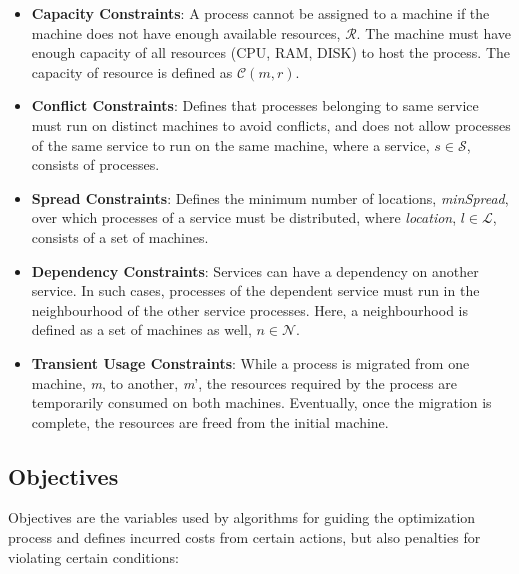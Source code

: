 \documentclass[a4paper,12pt]{Classes/RoboticsLaTeX}
\begin{document}
\begin{itemize}
\item
  \textbf{Capacity Constraints}: A process cannot be assigned to a machine if the machine does not have enough available resources, \(\mathcal{R}\). The machine must have enough capacity of all resources (CPU, RAM, DISK) to host the process. The capacity of resource is defined as \(\mathcal{C} (\textit{m}, \textit{r})\).
\item
  \textbf{Conflict Constraints}: Defines that processes belonging to same service must run on distinct machines to avoid conflicts, and does not allow processes of the same service to run on the same machine, where a service, \(\textit{s} \in \mathcal{S}\), consists of processes.
\item
  \textbf{Spread Constraints}: Defines the minimum number of locations, \emph{minSpread}, over which processes of a service must be distributed, where \emph{location}, \(\textit{l} \in \mathcal{L}\), consists of a set of machines.
\item
  \textbf{Dependency Constraints}: Services can have a dependency on another service. In such cases, processes of the dependent service must run in the neighbourhood of the other service processes. Here, a neighbourhood is defined as a set of machines as well, \(\textit{n} \in \mathcal{N}\).
\item
  \textbf{Transient Usage Constraints}: While a process is migrated from
  one machine, \textit{m}, to another, \textit{m}', the resources
  required by the process are temporarily consumed on both machines.
  Eventually, once the migration is complete, the resources are freed
  from the initial machine.
\end{itemize}

\subsection{Objectives}\label{objectives}

Objectives are the variables used by algorithms for guiding the optimization process and defines incurred costs from certain actions, but also penalties for violating certain conditions:
\end{document}
